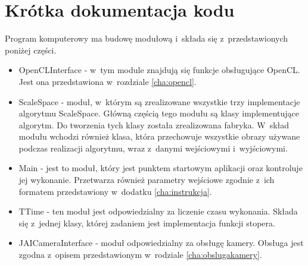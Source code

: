 \chapter{Krótka dokumentacja kodu}
\label{cha:dokumentacja}

Program komputerowy ma budowę modułową i~składa się z~przedstawionych poniżej części.

\begin{itemize}
\item OpenCLInterface - w~tym module znajdują się funkcje obsługujące OpenCL. Jest ona przedstawiona w~rozdziale \ref{cha:opencl}.
\item ScaleSpace - moduł, w~którym są zrealizowane wszystkie trzy implementacje algorytmu ScaleSpace. Główną częścią tego modułu są klasy implementujące algorytm. Do tworzenia tych klasy została zrealizowana fabryka. W~skład modułu wchodzi również klasa, która przechowuje wszystkie obrazy używane podczas realizacji algorytmu, wraz z~danymi wejściowymi i~wyjściowymi.
\item Main - jest to moduł, który jest punktem startowym aplikacji oraz kontroluje jej wykonanie. Przetwarza również parametry wejściowe zgodnie z~ich formatem przedstawiony w~dodatku \ref{cha:instrukcja}.
\item TTime - ten moduł jest odpowiedzialny za liczenie czasu wykonania. Składa się z~jednej klasy, której zadaniem jest implementacja funkcji stopera.
\item JAICameraInterface - moduł odpowiedzialny za obsługę kamery. Obsługa jest zgodna z~opisem przedstawionym w~rodziale \ref{cha:obslugakamery}.
\end{itemize}
